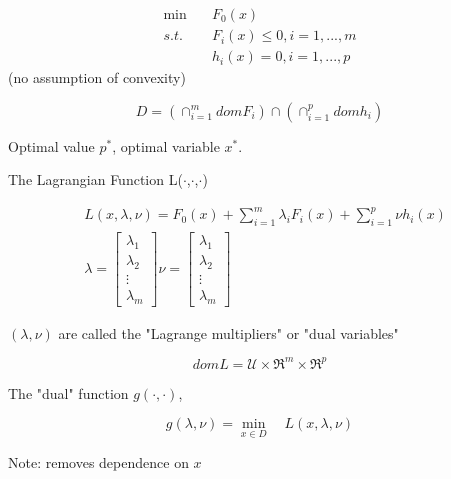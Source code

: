 

\begin{align*}
\min \quad&F_0(x) \\
s.t. \quad&F_i(x)\leq 0, i = 1,...,m\\
&h_i(x)= 0, i = 1,...,p
\end{align*}
(no assumption of convexity)

\begin{equation*}
D = (\cap^m_{i=1}domF_i)\cap(\cap^p_{i=1}domh_i)
\end{equation*}

Optimal value $p^*$, optimal variable $x^*$.

\begin{definition}{The Lagrangian Function}
	L($\cdot$,$\cdot$,$\cdot$)
	
	\begin{align*}
	&L(x,\lambda,\nu) = F_0(x) + \sum^m_{i=1}\lambda_i F_i(x) + \sum^p_{i=1}\nu h_i(x)\\
	&\lambda =\begin{bmatrix}
	\lambda_1\\
	\lambda_2\\
	\vdots\\
	\lambda_m
	\end{bmatrix}
	\nu = \begin{bmatrix}
		\lambda_1\\
		\lambda_2\\
		\vdots\\
		\lambda_m
	\end{bmatrix}
	\end{align*}
\end{definition}

$(\lambda, \nu)$ are called the "Lagrange multipliers" or "dual variables"

\begin{equation*}
domL = \mathcal{U}\times \Re^m \times \Re^p
\end{equation*}

\begin{definition}{The "dual" function}
	$g(\cdot, \cdot)$, 
	
	\begin{equation*}
	g(\lambda, \nu) = \min_{x\in D}\quad L(x,\lambda,\nu)
	\end{equation*}
	
	Note: removes dependence on $x$
\end{definition}

